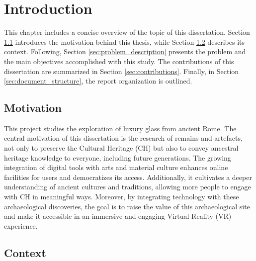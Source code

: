 
%

\chapter{Introduction}
\label{cha:introduction}

This chapter includes a concise overview of the topic of this dissertation. 
Section \ref{sec:motivation} introduces the motivation behind this thesis, while Section \ref{sec:context} describes its context.
Following, Section \ref{sec:problem_description} presents the problem and the main objectives accomplished with this study. 
The contributions of this dissertation are summarized in Section \ref{sec:contributions}.
Finally, in Section \ref{sec:document_structure}, the report organization is outlined.

\section{Motivation}
\label{sec:motivation}
This project studies the exploration of luxury glass from ancient Rome.
The central motivation of this dissertation is the research of remains and artefacts, not
only to preserve the Cultural Heritage (\gls{CH}) but also to convey ancestral heritage knowledge to everyone, including future generations. 
The growing integration of digital tools with arts and material culture enhances online 
facilities for users and democratizes its access. Additionally, it cultivates a deeper understanding of ancient cultures and traditions, allowing more people to engage with
\gls{CH} in meaningful ways. Moreover, by integrating technology with these archaeological 
discoveries, the goal is to raise the value of this archaeological site and make it accessible in an immersive and engaging Virtual Reality (\gls{VR}) experience.


\section{Context}
\label{sec:context}

